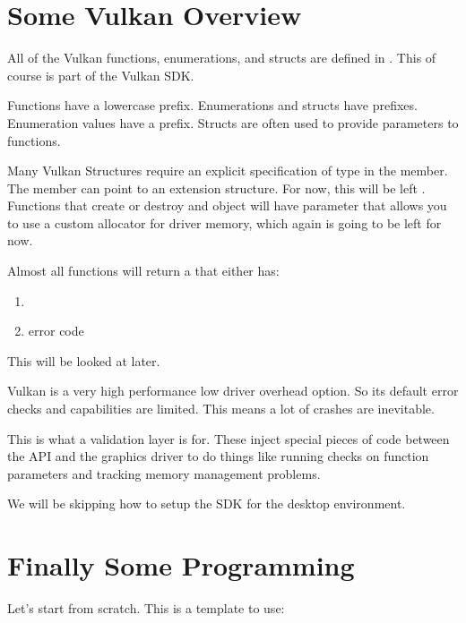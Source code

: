 \section*{Some Vulkan Overview}
\par All of the Vulkan functions, enumerations, and structs are defined in . This of course is part of the Vulkan SDK.

\par Functions have a lowercase  prefix. Enumerations and structs have  prefixes. Enumeration values have a  prefix. Structs are often used to provide parameters to functions.

\par Many Vulkan Structures require an explicit specification of type in the  member. The  member can point to an extension structure. For now, this will be left . Functions that create or destroy and object will have  parameter that allows you to use a custom allocator for driver memory, which again is going to be left  for now.

\par Almost all functions will return a that either has:
\begin{enumerate}
    \centering
    \item {}
    \item error code
\end{enumerate}
This will be looked at later.
\par Vulkan is a very high performance low driver overhead option. So its default error checks and capabilities are limited. This means a lot of crashes are inevitable.
\par This is what a validation layer is for. These inject special pieces of code between the API and the graphics driver to do things like running checks on function parameters and tracking memory management problems.

\par We will be skipping how to setup the SDK for the desktop environment.

\section*{Finally Some Programming}

\par Let's start from scratch. This is a template to use:


